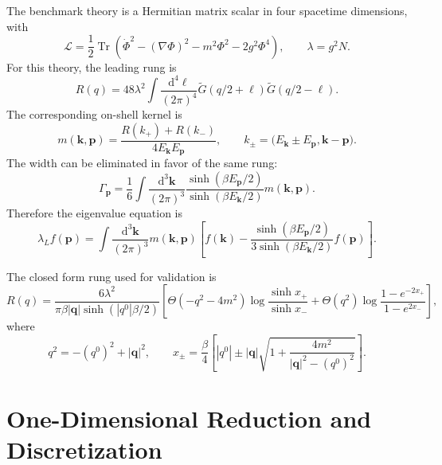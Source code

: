 \documentclass[11pt]{article}
\newcommand{\dd}{\mathrm{d}}
\newcommand{\Tr}{\operatorname{Tr}}
\begin{document}
The benchmark theory is a Hermitian matrix scalar in four spacetime dimensions,
with
\begin{equation}
  \mathcal L
  =
  \frac{1}{2}
  \Tr\left(
    \dot\Phi^2-(\nabla\Phi)^2-m^2\Phi^2-2g^2\Phi^4
  \right),
  \qquad
  \lambda = g^2N .
  \label{eq:stanford-lagrangian}
\end{equation}
For this theory, the leading rung is
\begin{equation}
  R(q)
  =
  48\lambda^2
  \int\frac{\dd^4\ell}{(2\pi)^4}
  \widetilde G(q/2+\ell)\widetilde G(q/2-\ell).
  \label{eq:stanford-rung-integral}
\end{equation}
The corresponding on-shell kernel is
\begin{equation}
  m(\mathbf k,\mathbf p)
  =
  \frac{R(k_+)+R(k_-)}{4E_{\mathbf k}E_{\mathbf p}},
  \qquad
  k_\pm =
  \bigl(E_{\mathbf k}\pm E_{\mathbf p},\mathbf k-\mathbf p\bigr).
  \label{eq:stanford-mkp}
\end{equation}
The width can be eliminated in favor of the same rung:
\begin{equation}
  \Gamma_{\mathbf p}
  =
  \frac{1}{6}
  \int\frac{\dd^3\mathbf k}{(2\pi)^3}
  \frac{\sinh(\beta E_{\mathbf p}/2)}
       {\sinh(\beta E_{\mathbf k}/2)}
  m(\mathbf k,\mathbf p).
  \label{eq:stanford-width-rung}
\end{equation}
Therefore the eigenvalue equation is
\begin{equation}
  \lambda_L f(\mathbf p)
  =
  \int\frac{\dd^3\mathbf k}{(2\pi)^3}
  m(\mathbf k,\mathbf p)
  \left[
    f(\mathbf k)
    -
    \frac{\sinh(\beta E_{\mathbf p}/2)}
         {3\sinh(\beta E_{\mathbf k}/2)}
    f(\mathbf p)
  \right].
  \label{eq:stanford-3d}
\end{equation}

The closed form rung used for validation is
\begin{equation}
  R(q)
  =
  \frac{6\lambda^2}
       {\pi\beta |\mathbf q|\sinh(|q^0|\beta/2)}
  \left[
    \Theta(-q^2-4m^2)
    \log\frac{\sinh x_+}{\sinh x_-}
    +
    \Theta(q^2)
    \log\frac{1-e^{-2x_+}}{1-e^{2x_-}}
  \right],
  \label{eq:stanford-rung-closed}
\end{equation}
where
\begin{equation}
  q^2 = -(q^0)^2+|\mathbf q|^2,
  \qquad
  x_\pm =
  \frac{\beta}{4}
  \left[
    |q^0|
    \pm
    |\mathbf q|
    \sqrt{1+\frac{4m^2}{|\mathbf q|^2-(q^0)^2}}
  \right].
  \label{eq:stanford-xpm}
\end{equation}

\section{One-Dimensional Reduction and Discretization}
\label{sec:numerics}
\end{document}
